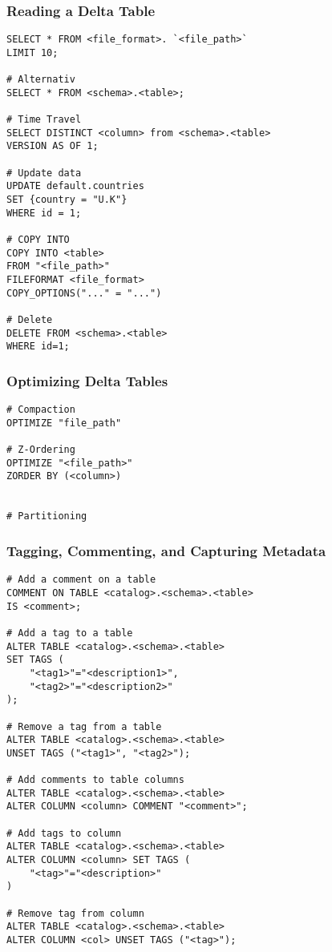 \documentclass[11pt]{scrartcl}
\begin{document}
\subsubsection{Reading a Delta Table}
\begin{lstlisting}
SELECT * FROM <file_format>. `<file_path>`
LIMIT 10;

# Alternativ
SELECT * FROM <schema>.<table>;

# Time Travel
SELECT DISTINCT <column> from <schema>.<table> 
VERSION AS OF 1;

# Update data
UPDATE default.countries
SET {country = "U.K"}
WHERE id = 1;

# COPY INTO
COPY INTO <table>
FROM "<file_path>"
FILEFORMAT <file_format>
COPY_OPTIONS("..." = "...")

# Delete
DELETE FROM <schema>.<table>
WHERE id=1;
\end{lstlisting}

\subsubsection{Optimizing Delta Tables} \label{optimize_sql}
\begin{lstlisting}
# Compaction
OPTIMIZE "file_path"

# Z-Ordering
OPTIMIZE "<file_path>" 
ZORDER BY (<column>)


# Partitioning
\end{lstlisting}

\subsubsection{Tagging, Commenting, and Capturing Metadata}
\begin{lstlisting}
# Add a comment on a table
COMMENT ON TABLE <catalog>.<schema>.<table> 
IS <comment>;

# Add a tag to a table
ALTER TABLE <catalog>.<schema>.<table> 
SET TAGS (
	"<tag1>"="<description1>",
	"<tag2>"="<description2>"
);

# Remove a tag from a table
ALTER TABLE <catalog>.<schema>.<table>
UNSET TAGS ("<tag1>", "<tag2>");

# Add comments to table columns
ALTER TABLE <catalog>.<schema>.<table>
ALTER COLUMN <column> COMMENT "<comment>";

# Add tags to column
ALTER TABLE <catalog>.<schema>.<table>
ALTER COLUMN <column> SET TAGS (
	"<tag>"="<description>"
)

# Remove tag from column
ALTER TABLE <catalog>.<schema>.<table>
ALTER COLUMN <col> UNSET TAGS ("<tag>");
\end{lstlisting}
\end{document}
